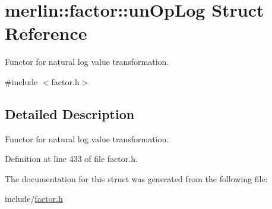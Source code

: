\hypertarget{structmerlin_1_1factor_1_1unOpLog}{}\section{merlin\+:\+:factor\+:\+:un\+Op\+Log Struct Reference}
\label{structmerlin_1_1factor_1_1unOpLog}


Functor for natural log value transformation.  




{\ttfamily \#include $<$factor.\+h$>$}



\subsection{Detailed Description}
Functor for natural log value transformation. 

Definition at line 433 of file factor.\+h.



The documentation for this struct was generated from the following file\+:\begin{DoxyCompactItemize}
\item 
include/\hyperlink{factor_8h}{factor.\+h}\end{DoxyCompactItemize}
